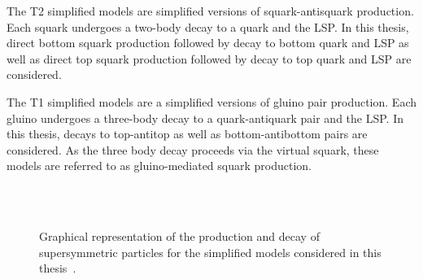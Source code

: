 The T2 simplified models are simplified versions of squark-antisquark production. Each squark undergoes
a two-body decay to a quark and the LSP. In this thesis, direct bottom squark production followed
by decay to bottom quark and LSP as well as direct top squark production followed by decay to top
quark and LSP are considered.

The T1 simplified models are a simplified versions of gluino pair production. Each gluino undergoes a three-body 
decay to a quark-antiquark pair and the LSP. In this thesis, decays to top-antitop as well as bottom-antibottom
pairs are considered. As the three body decay proceeds via the virtual squark, these models 
are referred to as gluino-mediated squark production.

\begin{figure}[h!]
  \begin{center}
     ~~
     \\
     ~~
    \caption{
      Graphical representation of the production and decay of supersymmetric particles 
      for the simplified models considered in this thesis~\cite{SMS}.
    }
    \label{fig:simplified-models-feyn}
  \end{center}
\end{figure}

